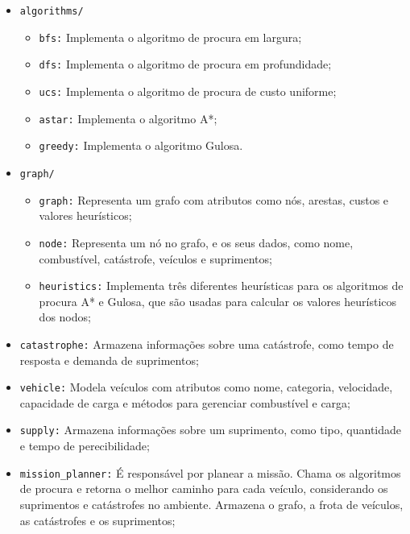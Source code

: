 \documentclass[a4paper,12pt]{scrreprt}
\begin{document}
\begin{itemize}
    \item \texttt{algorithms/}
    \begin{itemize}
        \item \texttt{bfs:} Implementa o algoritmo de procura em largura;
        \item \texttt{dfs:} Implementa o algoritmo de procura em profundidade;
        \item \texttt{ucs:} Implementa o algoritmo de procura de custo uniforme;
        \item \texttt{astar:} Implementa o algoritmo A*;
        \item \texttt{greedy:} Implementa o algoritmo Gulosa.
    \end{itemize}
    \item \texttt{graph/}
    \begin{itemize}
        \item \texttt{graph:} Representa um grafo com atributos como nós, arestas, custos e valores 
        heurísticos;
        \item \texttt{node:} Representa um nó no grafo, e os seus dados, como nome, combustível,
        catástrofe, veículos e suprimentos;
        \item \texttt{heuristics:} Implementa três diferentes heurísticas para os algoritmos de 
        procura A* e Gulosa, que são usadas para calcular os valores heurísticos dos nodos;
    \end{itemize}

    \item \texttt{catastrophe:} Armazena informações sobre uma catástrofe, como tempo de resposta
    e demanda de suprimentos;

    \item \texttt{vehicle:} Modela veículos com atributos como nome, categoria, velocidade,
    capacidade de carga e métodos para gerenciar combustível e carga;

    \item \texttt{supply:} Armazena informações sobre um suprimento, como tipo, quantidade e tempo
    de perecibilidade;

    \item \texttt{mission\_planner:} É responsável por planear a missão. Chama os algoritmos de procura
    e retorna o melhor caminho para cada veículo, considerando os suprimentos e catástrofes no ambiente.
    Armazena o grafo, a frota de veículos, as catástrofes e os suprimentos;


\end{itemize}
\end{document}
